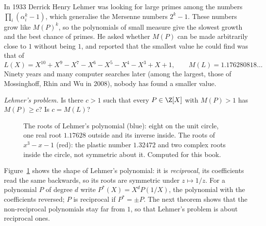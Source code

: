 In 1933 Derrick Henry Lehmer was looking for large primes among the numbers $\prod_i(\alpha_i^k-1)$, which generalise the Mersenne numbers $2^k-1$. These
numbers grow like $M(P)^k$, so the polynomials of small measure give the slowest growth and the best chance of primes. He asked whether $M(P)$ can be
made arbitrarily close to $1$ without being $1$, and reported that the smallest value he could find was that of
\[
L(X)=X^{10}+X^9-X^7-X^6-X^5-X^4-X^3+X+1,\qquad M(L)=1.176280818\ldots
\]
Ninety years and many computer searches later (among the largest, those of Mossinghoff, Rhin and Wu in 2008), nobody has found a smaller value.

\begin{center}
\emph{Lehmer's problem.} Is there $c>1$ such that every $P\in\Z[X]$ with $M(P)>1$ has $M(P)\ge c$? Is $c=M(L)$?
\end{center}

\begin{figure}[ht]
\centering
{}
\caption{The roots of Lehmer's polynomial (blue): eight on the unit circle, one real root $1.17628$ outside and its inverse inside. The roots of $x^3-x-1$
(red): the plastic number $1.32472$ and two complex roots inside the circle, not symmetric about it. Computed for this book.}
\label{fig:lehmer}
\end{figure}

Figure~\ref{fig:lehmer} shows the shape of Lehmer's polynomial: it is \emph{reciprocal}, its coefficients read the same backwards, so its roots are
symmetric under $z\mapsto1/z$. For a polynomial $P$ of degree $d$ write $P^*(X)=X^dP(1/X)$, the polynomial with the coefficients reversed; $P$ is reciprocal
if $P^*=\pm P$. The next theorem shows that the non-reciprocal polynomials stay far from $1$, so that Lehmer's problem is about reciprocal ones.

